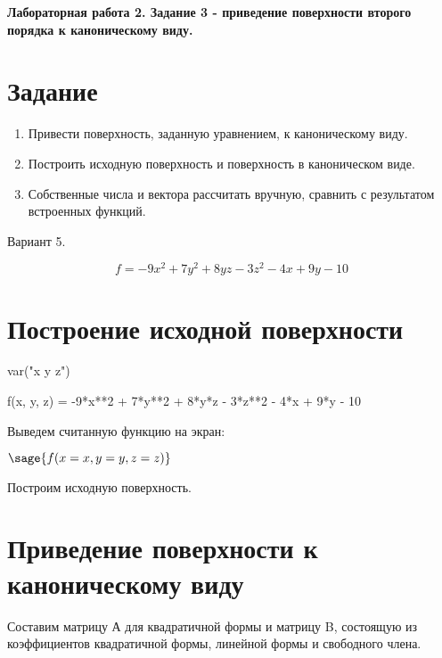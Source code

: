 \documentclass{article}
\author{Короткевич Л. В., М8О-208Б-19}
\begin{document}
\begin{center}
\Large{\textbf{Лабораторная работа 2. Задание 3 - приведение поверхности второго порядка к каноническому виду.}}
\end{center}

\section{Задание}
\begin{enumerate}
\item Привести поверхность, заданную уравнением, к каноническому виду.
\item Построить исходную поверхность и поверхность в каноническом виде.
\item Собственные числа и вектора рассчитать вручную, сравнить с результатом встроенных функций.
\end{enumerate}

\begin{center}
Вариант 5.
\end{center}
$$f = -9x^2 + 7y^2 + 8yz - 3z^2 - 4x + 9y - 10$$

\section{Построение исходной поверхности}
\begin{sagesilent}
var("x y z")
\end{sagesilent}
\begin{sageblock}
f(x, y, z) = -9*x**2 + 7*y**2 + 8*y*z - 3*z**2 - 4*x + 9*y - 10
\end{sageblock}

Выведем считанную функцию на экран:

\begin{center}
$\sage{f(x=x, y=y, z=z)}$
\end{center}

Построим исходную поверхность.

\begin{center}
\end{center}

\section{Приведение поверхности к каноническому виду}
Составим матрицу А для квадратичной формы и матрицу B, состоящую из коэффициентов квадратичной формы, линейной формы и свободного члена.
\end{document}
